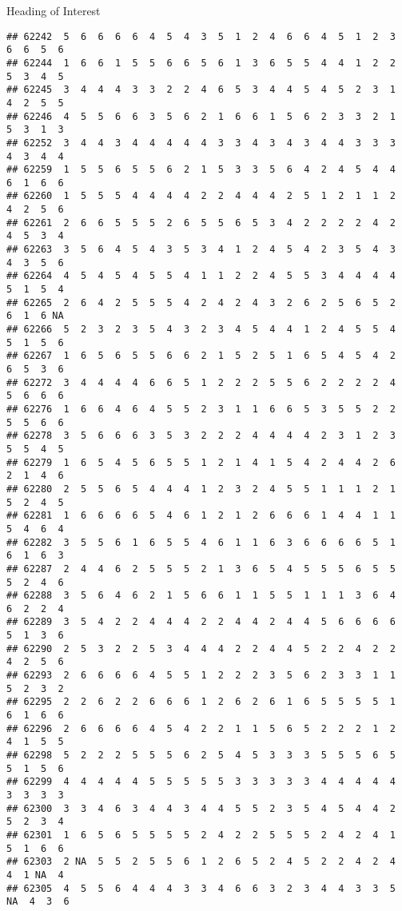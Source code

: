 \documentclass[
  ignorenonframetext,
]{beamer}
\begin{document}
\begin{frame}[fragile]{Heading of Interest}
\begin{verbatim}
## 62242  5  6  6  6  6  4  5  4  3  5  1  2  4  6  6  4  5  1  2  3  6  6  5  6
## 62244  1  6  6  1  5  5  6  6  5  6  1  3  6  5  5  4  4  1  2  2  5  3  4  5
## 62245  3  4  4  4  3  3  2  2  4  6  5  3  4  4  5  4  5  2  3  1  4  2  5  5
## 62246  4  5  5  6  6  3  5  6  2  1  6  6  1  5  6  2  3  3  2  1  5  3  1  3
## 62252  3  4  4  3  4  4  4  4  4  3  3  4  3  4  3  4  4  3  3  3  4  3  4  4
## 62259  1  5  5  6  5  5  6  2  1  5  3  3  5  6  4  2  4  5  4  4  6  1  6  6
## 62260  1  5  5  5  4  4  4  4  2  2  4  4  4  2  5  1  2  1  1  2  4  2  5  6
## 62261  2  6  6  5  5  5  2  6  5  5  6  5  3  4  2  2  2  2  4  2  4  5  3  4
## 62263  3  5  6  4  5  4  3  5  3  4  1  2  4  5  4  2  3  5  4  3  4  3  5  6
## 62264  4  5  4  5  4  5  5  4  1  1  2  2  4  5  5  3  4  4  4  4  5  1  5  4
## 62265  2  6  4  2  5  5  5  4  2  4  2  4  3  2  6  2  5  6  5  2  6  1  6 NA
## 62266  5  2  3  2  3  5  4  3  2  3  4  5  4  4  1  2  4  5  5  4  5  1  5  6
## 62267  1  6  5  6  5  5  6  6  2  1  5  2  5  1  6  5  4  5  4  2  6  5  3  6
## 62272  3  4  4  4  4  6  6  5  1  2  2  2  5  5  6  2  2  2  2  4  5  6  6  6
## 62276  1  6  6  4  6  4  5  5  2  3  1  1  6  6  5  3  5  5  2  2  5  5  6  6
## 62278  3  5  6  6  6  3  5  3  2  2  2  4  4  4  4  2  3  1  2  3  5  5  4  5
## 62279  1  6  5  4  5  6  5  5  1  2  1  4  1  5  4  2  4  4  2  6  2  1  4  6
## 62280  2  5  5  6  5  4  4  4  1  2  3  2  4  5  5  1  1  1  2  1  5  2  4  5
## 62281  1  6  6  6  6  5  4  6  1  2  1  2  6  6  6  1  4  4  1  1  5  4  6  4
## 62282  3  5  5  6  1  6  5  5  4  6  1  1  6  3  6  6  6  6  5  1  6  1  6  3
## 62287  2  4  4  6  2  5  5  5  2  1  3  6  5  4  5  5  5  6  5  5  5  2  4  6
## 62288  3  5  6  4  6  2  1  5  6  6  1  1  5  5  1  1  1  3  6  4  6  2  2  4
## 62289  3  5  4  2  2  4  4  4  2  2  4  4  2  4  4  5  6  6  6  6  5  1  3  6
## 62290  2  5  3  2  2  5  3  4  4  4  2  2  4  4  5  2  2  4  2  2  4  2  5  6
## 62293  2  6  6  6  6  4  5  5  1  2  2  2  3  5  6  2  3  3  1  1  5  2  3  2
## 62295  2  2  6  2  2  6  6  6  1  2  6  2  6  1  6  5  5  5  5  1  6  1  6  6
## 62296  2  6  6  6  6  4  5  4  2  2  1  1  5  6  5  2  2  2  1  2  4  1  5  5
## 62298  5  2  2  2  5  5  5  6  2  5  4  5  3  3  3  5  5  5  6  5  5  1  5  6
## 62299  4  4  4  4  4  5  5  5  5  5  3  3  3  3  3  4  4  4  4  4  3  3  3  3
## 62300  3  3  4  6  3  4  4  3  4  4  5  5  2  3  5  4  5  4  4  2  5  2  3  4
## 62301  1  6  5  6  5  5  5  5  2  4  2  2  5  5  5  2  4  2  4  1  5  1  6  6
## 62303  2 NA  5  5  2  5  5  6  1  2  6  5  2  4  5  2  2  4  2  4  4  1 NA  4
## 62305  4  5  5  6  4  4  4  3  3  4  6  6  3  2  3  4  4  3  3  5 NA  4  3  6

\end{verbatim}
\end{frame}
\end{document}
